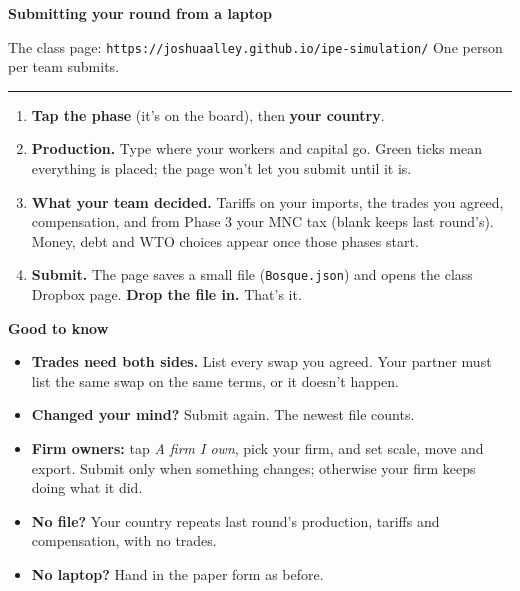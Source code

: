 \documentclass[11pt]{article}
\newcommand{\hr}{\par\vspace{2pt}\noindent\rule{\linewidth}{0.4pt}\par\vspace{2pt}}
\begin{document}
{\Large\bfseries Submitting your round from a laptop}\par
\vspace{2pt}
The class page: \texttt{https://joshuaalley.github.io/ipe-simulation/} \hfill One person per team submits.
\hr

\begin{enumerate}[leftmargin=1.6em,itemsep=6pt]
  \item \textbf{Tap the phase} (it's on the board), then \textbf{your country}.
  \item \textbf{Production.} Type where your workers and capital go. Green ticks
    mean everything is placed; the page won't let you submit until it is.
  \item \textbf{What your team decided.} Tariffs on your imports, the trades you
    agreed, compensation, and from Phase 3 your MNC tax (blank keeps last
    round's). Money, debt and WTO choices appear once those phases start.
  \item \textbf{Submit.} The page saves a small file (\texttt{Bosque.json}) and
    opens the class Dropbox page. \textbf{Drop the file in.} That's it.
\end{enumerate}

\vspace{6pt}
{\bfseries Good to know}
\begin{itemize}[leftmargin=1.4em,itemsep=4pt]
  \item \textbf{Trades need both sides.} List every swap you agreed. Your partner
    must list the same swap on the same terms, or it doesn't happen.
  \item \textbf{Changed your mind?} Submit again. The newest file counts.
  \item \textbf{Firm owners:} tap \emph{A firm I own}, pick your firm, and set scale,
    move and export. Submit only when something changes; otherwise your firm
    keeps doing what it did.
  \item \textbf{No file?} Your country repeats last round's production, tariffs
    and compensation, with no trades.
  \item \textbf{No laptop?} Hand in the paper form as before.
\end{itemize}
\end{document}
